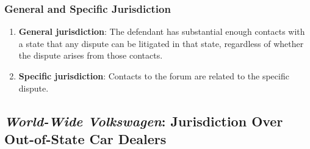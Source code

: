 \subsubsection{General and Specific Jurisdiction}

\begin{enumerate}
    \item \textbf{General jurisdiction}: The defendant has substantial enough contacts with a state that any dispute can be litigated in that state, regardless of whether the dispute arises from those contacts.
    \item \textbf{Specific jurisdiction}: Contacts to the forum are related to the specific dispute.
\end{enumerate}

\subsection{\emph{World-Wide Volkswagen}: Jurisdiction Over Out-of-State Car Dealers}

